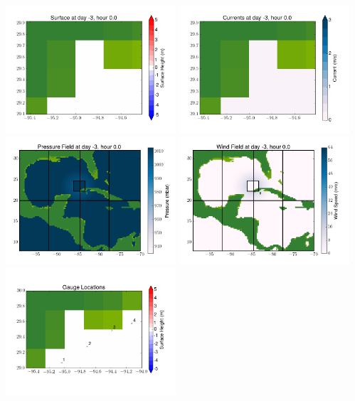 \documentclass[11pt]{article}
\begin{document}
\includegraphics[width=0.475\textwidth]{frame0000fig6.png}
\vskip 10pt 
\includegraphics[width=0.475\textwidth]{frame0000fig7.png}
\includegraphics[width=0.475\textwidth]{frame0000fig8.png}
\vskip 10pt 
\includegraphics[width=0.475\textwidth]{frame0000fig9.png}
\includegraphics[width=0.475\textwidth]{frame0000fig10.png}
\end{document}
